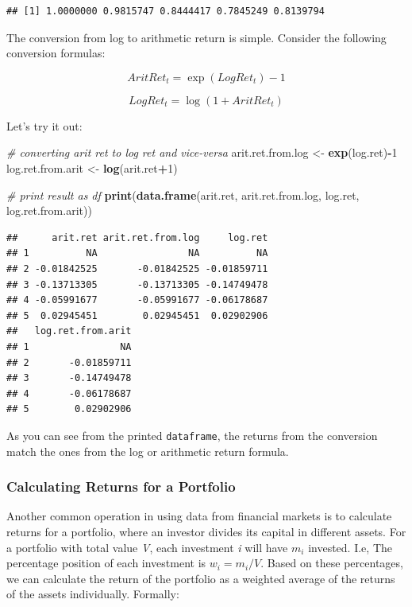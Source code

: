 \documentclass[11pt,]{book}
\newenvironment{Shaded}{\begin{snugshade}}{\end{snugshade}}
\newcommand{\KeywordTok}[1]{\textcolor[rgb]{0.27,0.27,0.27}{\textbf{#1}}}
\newcommand{\DecValTok}[1]{\textcolor[rgb]{0.06,0.06,0.06}{#1}}
\newcommand{\StringTok}[1]{\textcolor[rgb]{0.5,0.5,0.5}{#1}}
\newcommand{\CommentTok}[1]{\textcolor[rgb]{0.56,0.35,0.01}{\textit{#1}}}
\newcommand{\OperatorTok}[1]{\textcolor[rgb]{0.81,0.36,0.00}{\textbf{#1}}}
\newcommand{\NormalTok}[1]{#1}
\begin{document}
\begin{verbatim}
## [1] 1.0000000 0.9815747 0.8444417 0.7845249 0.8139794
\end{verbatim}

The conversion from log to arithmetic return is simple. Consider the
following conversion formulas:

\[AritRet_t = \exp(LogRet _t)-1 \]

\[LogRet _t = \log(1+AritRet _t)\]

Let's try it out:

\begin{Shaded}
\begin{Highlighting}[]
\CommentTok{# converting arit ret to log ret and vice-versa}
\NormalTok{arit.ret.from.log <-}\StringTok{ }\KeywordTok{exp}\NormalTok{(log.ret)}\OperatorTok{-}\DecValTok{1}
\NormalTok{log.ret.from.arit <-}\StringTok{ }\KeywordTok{log}\NormalTok{(arit.ret}\OperatorTok{+}\DecValTok{1}\NormalTok{)}

\CommentTok{# print result as df}
\KeywordTok{print}\NormalTok{(}\KeywordTok{data.frame}\NormalTok{(arit.ret, arit.ret.from.log,}
\NormalTok{                 log.ret, log.ret.from.arit))}
\end{Highlighting}
\end{Shaded}

\begin{verbatim}
##      arit.ret arit.ret.from.log     log.ret
## 1          NA                NA          NA
## 2 -0.01842525       -0.01842525 -0.01859711
## 3 -0.13713305       -0.13713305 -0.14749478
## 4 -0.05991677       -0.05991677 -0.06178687
## 5  0.02945451        0.02945451  0.02902906
##   log.ret.from.arit
## 1                NA
## 2       -0.01859711
## 3       -0.14749478
## 4       -0.06178687
## 5        0.02902906
\end{verbatim}

As you can see from the printed \texttt{dataframe}, the returns from the
conversion match the ones from the log or arithmetic return formula.

\subsubsection{Calculating Returns for a
Portfolio}\label{calculating-returns-for-a-portfolio}

Another common operation in using data from financial markets is to
calculate returns for a portfolio, where an investor divides its capital
in different assets. For a portfolio with total value \emph{V}, each
investment \emph{i} will have \(m_i\) invested. I.e, The percentage
position of each investment is \(w_i = m_i/V\). Based on these
percentages, we can calculate the return of the portfolio as a weighted
average of the returns of the assets individually. Formally:
\end{document}
